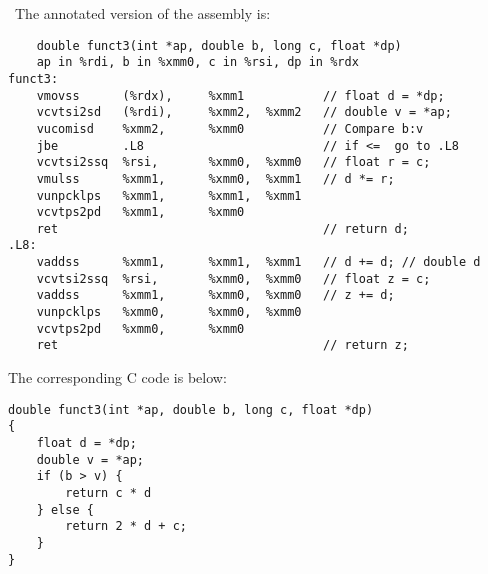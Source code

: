 \documentclass[12pt]{article}
\newenvironment{sol}[1][Solution]{\begin{trivlist}
		\item[\hskip \labelsep {\bfseries #1:}]}{\end{trivlist}}
\begin{document}
{\begin{sol}
	\
	The annotated version of the assembly is:
		\begin{lstlisting}
	double funct3(int *ap, double b, long c, float *dp)
	ap in %rdi, b in %xmm0, c in %rsi, dp in %rdx
funct3:
	vmovss		(%rdx),		%xmm1			// float d = *dp;
	vcvtsi2sd	(%rdi),		%xmm2,	%xmm2	// double v = *ap;
	vucomisd	%xmm2,		%xmm0			// Compare b:v
	jbe			.L8							// if <=  go to .L8
	vcvtsi2ssq	%rsi,		%xmm0,	%xmm0	// float r = c;
	vmulss		%xmm1,		%xmm0,	%xmm1	// d *= r;
	vunpcklps	%xmm1,		%xmm1,	%xmm1	
	vcvtps2pd	%xmm1,		%xmm0
	ret										// return d;
.L8:
	vaddss		%xmm1,		%xmm1,	%xmm1	// d += d; // double d
	vcvtsi2ssq	%rsi,		%xmm0,	%xmm0	// float z = c;
	vaddss		%xmm1,		%xmm0,	%xmm0	// z += d;
	vunpcklps	%xmm0,		%xmm0,	%xmm0	
	vcvtps2pd	%xmm0,		%xmm0
	ret										// return z;
		\end{lstlisting}
		The corresponding C code is below:
		\begin{lstlisting}
double funct3(int *ap, double b, long c, float *dp)
{
	float d = *dp;
	double v = *ap;
	if (b > v) {
		return c * d
	} else {
		return 2 * d + c;
	}
}
		\end{lstlisting}
\end{sol}
\end{document}
